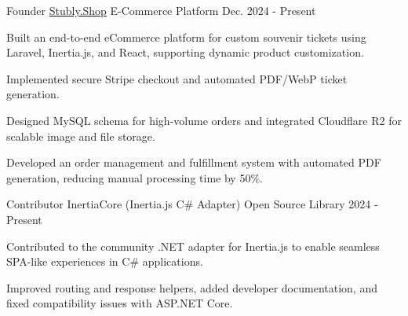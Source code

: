 
\begin{cventries}
  \cventry
    {Founder} %
    {\href{https://stubly.shop}{Stubly.Shop}} %
    {E-Commerce Platform} %
    {Dec. 2024 - Present} %
    {
      \begin{cvitems}
        \item {Built an end-to-end eCommerce platform for custom souvenir tickets using Laravel, Inertia.js, and React, supporting dynamic product customization.}
        \item {Implemented secure Stripe checkout and automated PDF/WebP ticket generation.}
        \item {Designed MySQL schema for high-volume orders and integrated Cloudflare R2 for scalable image and file storage.}
        \item {Developed an order management and fulfillment system with automated PDF generation, reducing manual processing time by 50\%.}
      \end{cvitems}
    }

  \cventry
    {Contributor}
    {InertiaCore (Inertia.js C\# Adapter)}
    {Open Source Library}
    {2024 - Present}
    {
      \begin{cvitems}
        \item {Contributed to the community .NET adapter for Inertia.js to enable seamless SPA-like experiences in C\# applications.}
        \item {Improved routing and response helpers, added developer documentation, and fixed compatibility issues with ASP.NET Core.}
      \end{cvitems}
    }
\end{cventries}

